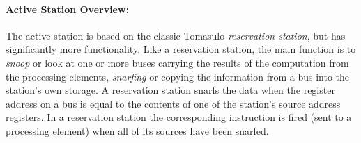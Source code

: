 \documentclass[10pt,dvips]{article}
\begin{document}
\paragraph{Active Station Overview: }
The active station is based on the classic Tomasulo {\it reservation
station}, but has significantly more functionality. Like a reservation station,
the main function is to {\it snoop} or look at one or more buses carrying the
results of the computation from the processing elements, {\it snarfing} or
copying the information from a bus into the station's own storage. A reservation
station snarfs the data when the register address on a bus is equal to the contents of
one of the station's source address registers. In a reservation station the
corresponding instruction is fired (sent to a processing element) when all of its
sources have been snarfed.
\end{document}
